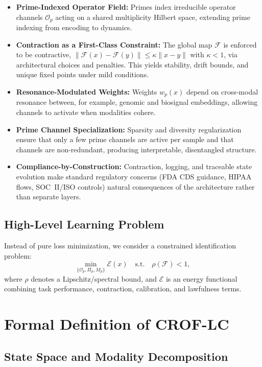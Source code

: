 \documentclass[11pt]{article}
\begin{document}
\begin{itemize}[leftmargin=*]
  \item \textbf{Prime-Indexed Operator Field:}
  Primes index irreducible operator channels \(\mathcal{O}_p\) acting on a shared multiplicity Hilbert space, extending prime indexing from encoding to dynamics.
  \item \textbf{Contraction as a First-Class Constraint:}
  The global map \(\mathcal{F}\) is enforced to be contractive,
  \(\|\mathcal{F}(x) - \mathcal{F}(y)\| \leq \kappa \|x-y\|\) with \(\kappa < 1\),
  via architectural choices and penalties.
  This yields stability, drift bounds, and unique fixed points under mild conditions.
  \item \textbf{Resonance-Modulated Weights:}
  Weights \(w_p(x)\) depend on cross-modal resonance between, for example, genomic and biosignal embeddings, allowing channels to activate when modalities cohere.
  \item \textbf{Prime Channel Specialization:}
  Sparsity and diversity regularization ensure that only a few prime channels are active per sample and that channels are non-redundant, producing interpretable, disentangled structure.
  \item \textbf{Compliance-by-Construction:}
  Contraction, logging, and traceable state evolution make standard regulatory concerns (FDA CDS guidance, HIPAA flows, SOC~II/ISO controls) natural consequences of the architecture rather than separate layers.
\end{itemize}

\subsection{High-Level Learning Problem}

Instead of pure loss minimization, we consider a constrained identification problem:
\[
  \min_{\{\mathcal{O}_p, \Pi_p, M_p\}} \mathcal{E}(x)
  \quad \text{s.t.} \quad
  \rho(\mathcal{F}) < 1,
\]
where \(\rho\) denotes a Lipschitz/spectral bound, and \(\mathcal{E}\) is an energy functional combining task performance, contraction, calibration, and lawfulness terms.

\section{Formal Definition of CROF-LC}

\subsection{State Space and Modality Decomposition}
\end{document}
